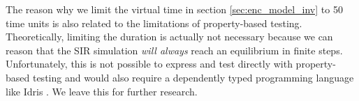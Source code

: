 The reason why we limit the virtual time in section \ref{sec:enc_model_inv} to 50 time units is also related to the limitations of property-based testing. Theoretically, limiting the duration is actually not necessary because we can reason that the SIR simulation \textit{will always} reach an equilibrium in finite steps. Unfortunately, this is not possible to express and test directly with property-based testing and would also require a dependently typed programming language like Idris \cite{brady_idris_2013,brady_type-driven_2017}. We leave this for further research.